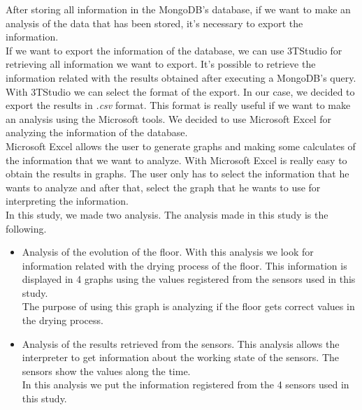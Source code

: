 After storing all information in the MongoDB's database, if we want to make an analysis of the data that has been stored, it's necessary to export the information.\\

If we want to export the information of the database, we can use 3TStudio for retrieving all information we want to export. It's possible to retrieve the information related with the results obtained after executing a MongoDB's query.\\

With 3TStudio we can select the format of the export. In our case, we decided to export the results in \textit{.csv} format. This format is really useful if we want to make an analysis using the Microsoft tools. We decided to use Microsoft Excel for analyzing the information of the database.\\

Microsoft Excel allows the user to generate graphs and making some calculates of the information that we want to analyze. With Microsoft Excel is really easy to obtain the results in graphs. The user only has to select the information that he wants to analyze and after that, select the graph that he wants to use for interpreting the information.\\

In this study, we made two analysis. The analysis made in this study is the following.

\begin{itemize}

\item Analysis of the evolution of the floor. With this analysis we look for information related with the drying process of the floor. This information is displayed in 4 graphs using the values registered from the sensors used in this study.\\

The purpose of using this graph is analyzing if the floor gets correct values in the drying process.

\item Analysis of the results retrieved from the sensors. This analysis allows the interpreter to get information about the working state of the sensors. The sensors show the values along the time.\\

In this analysis we put the information registered from the 4 sensors used in this study.

\end{itemize}

